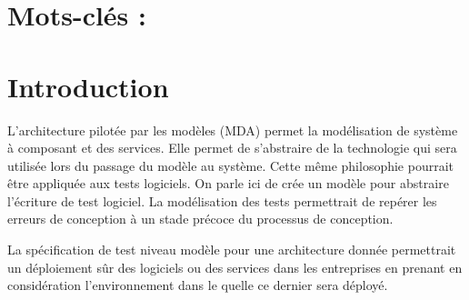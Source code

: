 \documentclass[
10pt, %
a4paper, %
oneside, %
headinclude,footinclude, %
BCOR5mm, %
]{article}
\begin{document}
\lipsum[1] %


\section*{Mots-clés : }





\newpage %


\section{Introduction}

L’architecture pilotée par les modèles (MDA) permet la modélisation de système à composant et des services. Elle permet de s’abstraire de la technologie qui sera utilisée lors du passage du modèle au système. Cette même philosophie pourrait être appliquée aux tests logiciels. On parle ici de crée un modèle pour abstraire l’écriture de test logiciel. La modélisation des tests permettrait de repérer les erreurs de conception à un stade précoce du processus de conception.

La spécification de test niveau modèle pour une architecture donnée permettrait un déploiement sûr des logiciels ou des services dans les entreprises en prenant en considération l'environnement dans le quelle ce dernier sera déployé. \citep{Nobody06}
 
\end{document}

